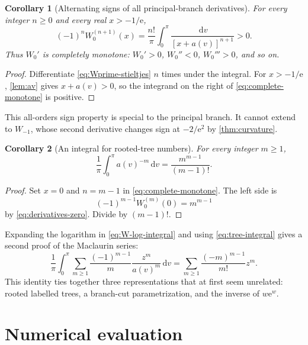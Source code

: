 \documentclass[11pt]{article}
\newtheorem{corollary}[corollary]{Corollary}
\theoremstyle{remark}
\newcommand{\ee}{\mathrm e}
\newcommand{\dd}{\,\mathrm d}
\begin{document}
\begin{corollary}[Alternating signs of all principal-branch derivatives]
For every integer \(n\geq0\) and every real \(x>-1/\ee\),
\begin{equation}\label{eq:complete-monotone}
 (-1)^n W_0^{(n+1)}(x)
 =\frac{n!}{\pi}\int_0^\pi
 \frac{\dd v}{[x+a(v)]^{n+1}}>0.
\end{equation}
Thus \(W_0'\) is completely monotone: \(W_0'>0\),
\(W_0''<0\), \(W_0'''>0\), and so on.
\end{corollary}

\begin{proof}
Differentiate \eqref{eq:Wprime-stieltjes} \(n\) times under the integral.
For \(x>-1/\ee\), \cref{lem:av} gives \(x+a(v)>0\), so the integrand on
the right of \eqref{eq:complete-monotone} is positive.
\end{proof}

This all-orders sign property is special to the principal branch.  It cannot
extend to \(W_{-1}\), whose second derivative changes sign at
\(-2/\ee^2\) by \cref{thm:curvature}.

\begin{corollary}[An integral for rooted-tree numbers]\label{cor:tree-integral}
For every integer \(m\geq1\),
\begin{equation}\label{eq:tree-integral}
 \frac1\pi\int_0^\pi a(v)^{-m}\dd v
 =\frac{m^{m-1}}{(m-1)!}.
\end{equation}
\end{corollary}

\begin{proof}
Set \(x=0\) and \(n=m-1\) in
\eqref{eq:complete-monotone}.  The left side is
\[
       (-1)^{m-1}W_0^{(m)}(0)
       =m^{m-1}
\]
by \eqref{eq:derivatives-zero}.  Divide by \((m-1)!\).
\end{proof}

Expanding the logarithm in \eqref{eq:W-log-integral} and using
\eqref{eq:tree-integral} gives a second proof of the Maclaurin series:
\[
 \frac1\pi\int_0^\pi\sum_{m\geq1}
 \frac{(-1)^{m-1}}m\frac{z^m}{a(v)^m}\dd v
 =
 \sum_{m\geq1}\frac{(-m)^{m-1}}{m!}z^m.
\]
This identity ties together three representations that at first seem
unrelated: rooted labelled trees, a branch-cut parametrization, and the
inverse of \(w\ee^w\).


\section{Numerical evaluation}\label{sec:numerics}
\end{document}

